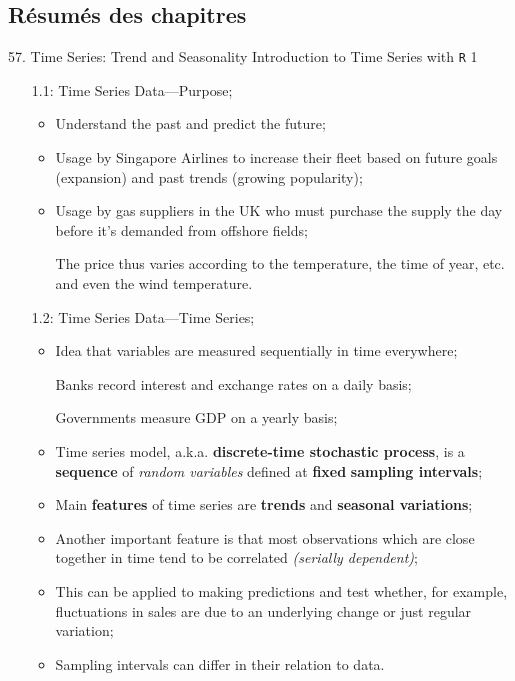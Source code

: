 \documentclass[12pt, titlepage, french]{report}
\begin{document}
\subsection{Résumés des chapitres}

\begin{CHPT_SUMM_AUTO}[label = {L.-57}]{57. Time Series: Trend and Seasonality}
Introduction to Time Series with \texttt{R} 1
\begin{itemize}
	\item[1.1:]	Time Series Data---Purpose;
		\begin{itemize}
		\item	Understand the past and predict the future;
		\item	Usage by Singapore Airlines to increase their fleet based on future goals (expansion) and past trends (growing popularity);
		\item	Usage by gas suppliers in the UK who must purchase the supply the day before it's demanded from offshore fields;
		\item[]	The price thus varies according to the temperature, the time of year, etc. and even the wind temperature.
		\end{itemize}
	\item[1.2:]	Time Series Data---Time Series;
		\begin{itemize}
		\item	Idea that variables are measured sequentially in time everywhere;
		\item[]	Banks record interest and exchange rates on a daily basis;
		\item[]	Governments measure GDP on a yearly basis;
		\item	Time series model, a.k.a. \textbf{discrete-time stochastic process}, is a \textbf{sequence} of \textit{random variables} defined at \textbf{fixed} \textbf{sampling intervals};
		\item	Main \textbf{features} of time series are \textbf{trends} and \textbf{seasonal variations};
		\item	Another important feature is that most observations which are close together in time tend to be correlated \textit{(serially dependent)};
		\item	This can be applied to making predictions and test whether, for example, fluctuations in sales are due to an underlying change or just regular variation;
		\item	Sampling intervals can differ in their relation to data.
			\begin{itemize}

\end{itemize}
\end{itemize}
\end{itemize}
\end{CHPT_SUMM_AUTO}
\end{document}
